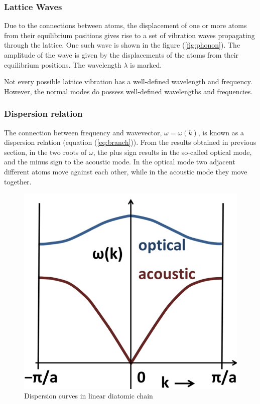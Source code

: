 \documentclass[%
 aip,
 amsmath,amssymb,
 reprint, floatfix%
]{revtex4-1}
\begin{document}
        \subsubsection{Lattice Waves}
        Due to the connections between atoms, the displacement of one or more atoms from their equilibrium positions gives rise to a set of vibration waves propagating through the lattice. One such wave is shown in the figure (\ref{fig:phonon}). The amplitude of the wave is given by the displacements of the atoms from their equilibrium positions. The wavelength $\lambda$ is marked.
        \par
        Not every possible lattice vibration has a well-defined wavelength and frequency. However, the normal modes do possess well-defined wavelengths and frequencies.
        \subsubsection{Dispersion relation}
        The connection between frequency and wavevector, $\omega = \omega(k)$, is known as a dispersion relation (equation (\ref{eq:branch})). From the results obtained in previous section, in the two roots of $\omega$, the plus sign results in the so-called optical mode, and the minus sign to the acoustic mode. In the optical mode two adjacent different atoms move against each other, while in the acoustic mode they move together.
        \begin{figure}
            \centering
            \includegraphics[scale = 0.4]{Figures/653px-Diatomic_phonons.png}
            \caption{Dispersion curves in linear diatomic chain}
            \label{fig:dispersion}
        \end{figure}
\end{document}
